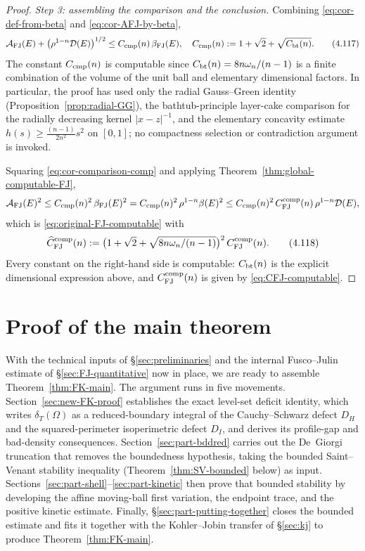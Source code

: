 \documentclass[11pt]{amsart}
\theoremstyle{definition}
\newcommand{\Om}{\Omega}
\newcommand{\dT}{\delta_T}
\newcommand{\Def}{\mathcal D}
\begin{document}
\begin{proof}
\smallskip
\noindent\emph{Step 3: assembling the comparison and the conclusion.}
Combining \eqref{eq:cor-def-from-beta} and \eqref{eq:cor-AFJ-by-beta},
\begin{equation}\label{eq:cor-comparison-comp}
   \mathcal A_{\rm FJ}(E)
      +\bigl(\rho^{1-n}\Def(E)\bigr)^{1/2}
      \le C_{\rm cmp}(n)\,\beta_{\rm FJ}(E),
   \quad
   C_{\rm cmp}(n):=1+\sqrt{2}+\sqrt{C_{\rm bt}(n)}.
\tag{4.117}
\end{equation}
The constant \(C_{\rm cmp}(n)\) is computable since
\(C_{\rm bt}(n)=8n\omega_n/(n-1)\) is a finite combination of the volume
of the unit ball and elementary dimensional factors.  In particular, the
proof has used only the radial Gauss--Green identity
(Proposition~\ref{prop:radial-GG}), the bathtub-principle layer-cake
comparison for the radially decreasing kernel \(|x-z|^{-1}\), and the
elementary concavity estimate
\(h(s)\ge\tfrac{(n-1)}{2n^2}s^2\) on \([0,1]\); no compactness selection
or contradiction argument is invoked.

Squaring \eqref{eq:cor-comparison-comp} and applying
Theorem~\ref{thm:global-computable-FJ},
\[
   \mathcal A_{\rm FJ}(E)^2
   \le C_{\rm cmp}(n)^2\,\beta_{\rm FJ}(E)^2
   =C_{\rm cmp}(n)^2\,\rho^{1-n}\beta(E)^2
   \le C_{\rm cmp}(n)^2\,C_{\rm FJ}^{\rm comp}(n)\,\rho^{1-n}\Def(E),
\]
which is \eqref{eq:original-FJ-computable} with
\begin{equation}\label{eq:cor-final-constant}
   \widehat C_{\rm FJ}^{\rm comp}(n)
   :=\bigl(1+\sqrt{2}+\sqrt{8n\omega_n/(n-1)}\bigr)^{2}\,
     C_{\rm FJ}^{\rm comp}(n).
\tag{4.118}
\end{equation}
Every constant on the right-hand side is computable: \(C_{\rm bt}(n)\)
is the explicit dimensional expression above, and
\(C_{\rm FJ}^{\rm comp}(n)\) is given by
\eqref{eq:CFJ-computable}.
\end{proof}


\section{Proof of the main theorem}\label{sec:main-proof}

With the technical inputs of \S\ref{sec:preliminaries} and the internal
Fusco--Julin estimate of \S\ref{sec:FJ-quantitative} now in place, we are
ready to assemble Theorem~\ref{thm:FK-main}.  The argument runs in five
movements.  Section~\ref{sec:new-FK-proof} establishes the exact level-set
deficit identity, which writes \(\dT(\Om)\) as a reduced-boundary
integral of the Cauchy--Schwarz defect \(D_H\) and the squared-perimeter
isoperimetric defect \(D_I\), and derives its profile-gap and
bad-density consequences.  Section~\ref{sec:part-bddred} carries out the
De~Giorgi truncation that removes the boundedness hypothesis, taking the
bounded Saint--Venant stability inequality (Theorem~\ref{thm:SV-bounded}
below) as input.  Sections~\ref{sec:part-shell}--\ref{sec:part-kinetic}
then prove that bounded stability by developing the affine moving-ball
first variation, the endpoint trace, and the positive kinetic estimate.
Finally, \S\ref{sec:part-putting-together} closes the bounded estimate
and fits it together with the Kohler--Jobin transfer of \S\ref{sec:kj}
to produce Theorem~\ref{thm:FK-main}.
\end{document}
